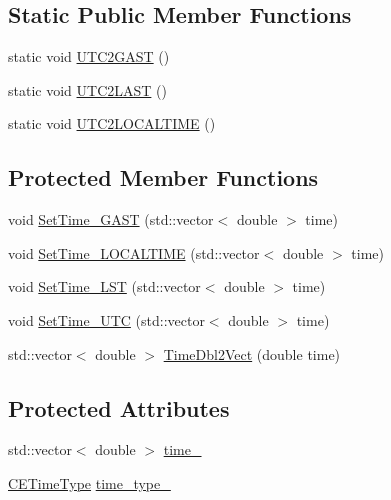\subsection*{Static Public Member Functions}
\begin{DoxyCompactItemize}
\item 
static void \hyperlink{class_c_e_time_a9164c370f3f6517d72b92239f928425c}{U\+T\+C2\+G\+A\+S\+T} ()
\item 
static void \hyperlink{class_c_e_time_a0bc67938e50e052053cb50298580ab7d}{U\+T\+C2\+L\+A\+S\+T} ()
\item 
static void \hyperlink{class_c_e_time_aff5450aa7d7347cf5bb20e9a61840a75}{U\+T\+C2\+L\+O\+C\+A\+L\+T\+I\+M\+E} ()
\end{DoxyCompactItemize}
\subsection*{Protected Member Functions}
\begin{DoxyCompactItemize}
\item 
void \hyperlink{class_c_e_time_a8bb9552b5e5a15624aacb7f64c23c736}{Set\+Time\+\_\+\+G\+A\+S\+T} (std\+::vector$<$ double $>$ time)
\item 
void \hyperlink{class_c_e_time_ac4f727594747d04e58832495c7172045}{Set\+Time\+\_\+\+L\+O\+C\+A\+L\+T\+I\+M\+E} (std\+::vector$<$ double $>$ time)
\item 
void \hyperlink{class_c_e_time_ace112b5a3c97d4b96d891092f3020f9c}{Set\+Time\+\_\+\+L\+S\+T} (std\+::vector$<$ double $>$ time)
\item 
void \hyperlink{class_c_e_time_a4875e7ee19b9763c56f4b8f4b867e9ca}{Set\+Time\+\_\+\+U\+T\+C} (std\+::vector$<$ double $>$ time)
\item 
std\+::vector$<$ double $>$ \hyperlink{class_c_e_time_a6653740b539e9ea85d056daa14c654d1}{Time\+Dbl2\+Vect} (double time)
\end{DoxyCompactItemize}
\subsection*{Protected Attributes}
\begin{DoxyCompactItemize}
\item 
std\+::vector$<$ double $>$ \hyperlink{class_c_e_time_a6fd743f19f38b7e9e76887725fedb6e0}{time\+\_\+}
\item 
\hyperlink{_c_e_time_8h_ab50b2d3a782e5eea768b25bfb3d7e65f}{C\+E\+Time\+Type} \hyperlink{class_c_e_time_aa3d0704d43eed2d09dc4f688a78ab44b}{time\+\_\+type\+\_\+}
\end{DoxyCompactItemize}


